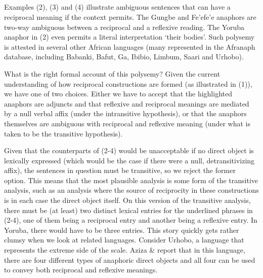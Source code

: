 \documentclass[output=paper]{langsci/langscibook}
\begin{document}
\begin{listWWviiiNumxlileveli}
\item \ea\label{ex:}
\\
\ea\label{ex:}
\\
\ea\label{ex:}
\\
\ea\label{ex:}
\\
\end{listWWviiiNumxlileveli}

Examples (2), (3) and (4) illustrate ambiguous sentences that can have a reciprocal meaning if the context permits. The Gungbe and Fe'efe'e anaphors are two-way ambiguous between a reciprocal and a reflexive reading. The Yoruba anaphor in (2) even permits a literal interpretation ‘their bodies’. Such polysemy is attested in several other African languages (many represented in the Afranaph database, including Babanki, Bafut, Ga, Ibibio, Limbum, Saari and Urhobo).

  What is the right formal account of this polysemy? Given the current understanding of how reciprocal constructions are formed (as illustrated in (1)), we have one of two choices. Either we have to accept that the highlighted anaphors are adjuncts and that reflexive and reciprocal meanings are mediated by a null verbal affix (under the intransitive hypothesis), or that the anaphors themselves are ambiguous with reciprocal and reflexive meaning (under what is taken to be the transitive hypothesis). 

  Given that the counterparts of (2-4) would be unacceptable if no direct object is lexically expressed (which would be the case if there were a null, detransitivizing affix), the sentences in question must be transitive, so we reject the former option. This means that the most plausible analysis is some form of the transitive analysis, such as an analysis where the source of reciprocity in these constructions is in each case the direct object itself. On this version of the transitive analysis, there must be (at least) two distinct lexical entries for the underlined phrases in (2-4), one of them being a reciprocal entry and another being a reflexive entry. In Yoruba, there would have to be three entries. This story quickly gets rather clumsy when we look at related languages. Consider Urhobo, a language that represents the extreme side of the scale. Aziza \& \citet{Safir2006} report that in this language, there are four different types of anaphoric direct objects and all four can be used to convey both reciprocal and reflexive meanings. 
\end{document}
